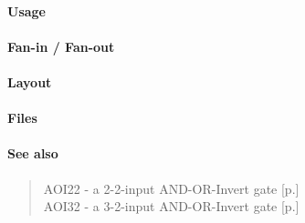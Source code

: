 \paragraph{Usage}

\paragraph{Fan-in / Fan-out}

\paragraph{Layout}

\paragraph{Files}

\paragraph{See also}
\begin{quote}
    AOI22 - a 2-2-input AND-OR-Invert gate [p.\pageref{AOI22}] \\
    AOI32 - a 3-2-input AND-OR-Invert gate [p.\pageref{AOI32}]
\end{quote}
